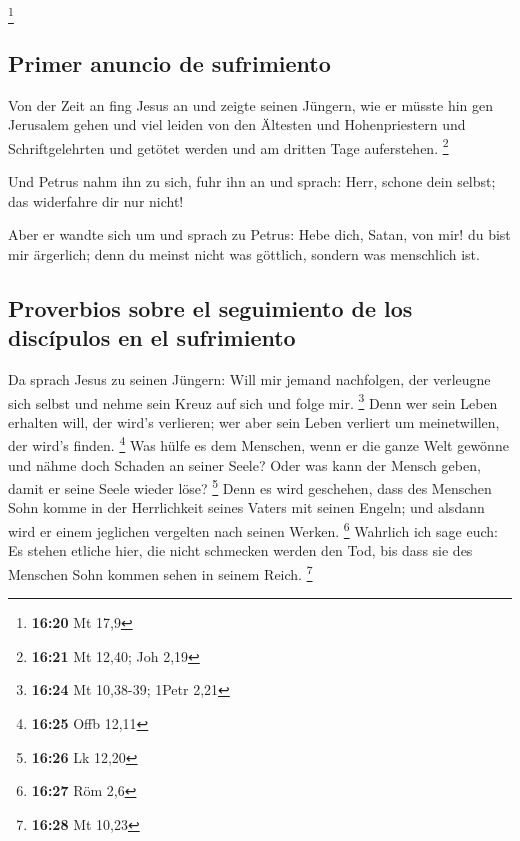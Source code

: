 \footnote{\textbf{16:20} Mt 17,9}

\hypertarget{primer-anuncio-de-sufrimiento}{%
\subsection{Primer anuncio de
sufrimiento}\label{primer-anuncio-de-sufrimiento}}

 Von der Zeit an fing Jesus an und zeigte seinen Jüngern,
wie er müsste hin gen Jerusalem gehen und viel leiden von den Ältesten
und Hohenpriestern und Schriftgelehrten und getötet werden und am
dritten Tage auferstehen. \footnote{\textbf{16:21} Mt 12,40; Joh 2,19}

 Und Petrus nahm ihn zu sich, fuhr ihn an und sprach:
Herr, schone dein selbst; das widerfahre dir nur nicht!

 Aber er wandte sich um und sprach zu Petrus: Hebe dich,
Satan, von mir! du bist mir ärgerlich; denn du meinst nicht was
göttlich, sondern was menschlich ist.

\hypertarget{proverbios-sobre-el-seguimiento-de-los-discuxedpulos-en-el-sufrimiento}{%
\subsection{Proverbios sobre el seguimiento de los discípulos en el
sufrimiento}\label{proverbios-sobre-el-seguimiento-de-los-discuxedpulos-en-el-sufrimiento}}

 Da sprach Jesus zu seinen Jüngern: Will mir jemand
nachfolgen, der verleugne sich selbst und nehme sein Kreuz auf sich und
folge mir. \footnote{\textbf{16:24} Mt 10,38-39; 1Petr 2,21}
 Denn wer sein Leben erhalten will, der wird's verlieren;
wer aber sein Leben verliert um meinetwillen, der wird's finden.
\footnote{\textbf{16:25} Offb 12,11}  Was hülfe es dem
Menschen, wenn er die ganze Welt gewönne und nähme doch Schaden an
seiner Seele? Oder was kann der Mensch geben, damit er seine Seele
wieder löse? \footnote{\textbf{16:26} Lk 12,20}  Denn es
wird geschehen, dass des Menschen Sohn komme in der Herrlichkeit seines
Vaters mit seinen Engeln; und alsdann wird er einem jeglichen vergelten
nach seinen Werken. \footnote{\textbf{16:27} Röm 2,6} 
Wahrlich ich sage euch: Es stehen etliche hier, die nicht schmecken
werden den Tod, bis dass sie des Menschen Sohn kommen sehen in seinem
Reich. \footnote{\textbf{16:28} Mt 10,23}

